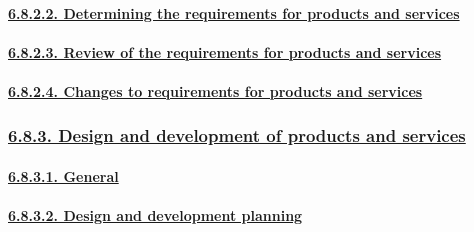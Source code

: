 \documentclass[
]{article}
\begin{document}
\hypertarget{determining-the-requirements-for-products-and-services}{%
\paragraph{\texorpdfstring{\protect\hyperlink{determining-the-requirements-for-products-and-services-1}{6.8.2.2.
Determining the requirements for products and
services}}{6.8.2.2. Determining the requirements for products and services}}\label{determining-the-requirements-for-products-and-services}}

\hypertarget{review-of-the-requirements-for-products-and-services}{%
\paragraph{\texorpdfstring{\protect\hyperlink{review-of-the-requirements-for-products-and-services-1}{6.8.2.3.
Review of the requirements for products and
services}}{6.8.2.3. Review of the requirements for products and services}}\label{review-of-the-requirements-for-products-and-services}}

\hypertarget{changes-to-requirements-for-products-and-services}{%
\paragraph{\texorpdfstring{\protect\hyperlink{changes-to-requirements-for-products-and-services-1}{6.8.2.4.
Changes to requirements for products and
services}}{6.8.2.4. Changes to requirements for products and services}}\label{changes-to-requirements-for-products-and-services}}

\hypertarget{design-and-development-of-products-and-services}{%
\subsubsection{\texorpdfstring{\protect\hyperlink{design-and-development-of-products-and-services-1}{6.8.3.
Design and development of products and
services}}{6.8.3. Design and development of products and services}}\label{design-and-development-of-products-and-services}}

\hypertarget{general-4}{%
\paragraph{\texorpdfstring{\protect\hyperlink{general-13}{6.8.3.1.
General}}{6.8.3.1. General}}\label{general-4}}

\hypertarget{design-and-development-planning}{%
\paragraph{\texorpdfstring{\protect\hyperlink{design-and-development-planning-1}{6.8.3.2.
Design and development
planning}}{6.8.3.2. Design and development planning}}\label{design-and-development-planning}}
\end{document}
